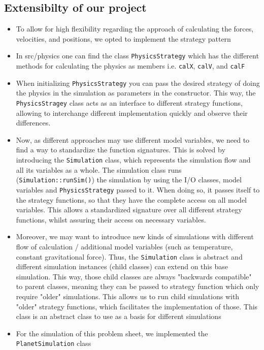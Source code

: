 \documentclass{article}
\begin{document}
\subsection{Extensibilty of our project}
\begin{itemize}
    \item To allow for high flexibility regarding the approach of calculating the forces, velocities, and positions, we opted to implement the strategy pattern
    \item In src/physics one can find the class \verb|PhysicsStrategy| which has the different methods for calculating the physics as members i.e. \verb|calX|, \verb|calV|, and \verb|calF|
    \item When initializing \verb|PhysicsStrategy| you can pass the desired strategy of doing the physics in the simulation as parameters in the constructor. This way, the \verb|PhysicsStragey| class acts as an interface to different strategy functions, allowing to interchange different implementation quickly and observe their differences.
    \item Now, as different approaches may use different model variables, we need to find a way to standardize the function signatures. This is solved by introducing the \verb|Simulation| class, which represents the simulation flow and all its variables as a whole. The simulation class runs (\verb|Simulation::runSim()|) the simulation by using the I/O classes, model variables and \verb|PhysicsStrategy| passed to it. When doing so, it passes itself to the strategy functions, so that they have the complete access on all model variables. This allows a standardized signature over all different strategy functions, whilst assuring their access on necessary variables.
    \item Moreover, we may want to introduce new kinds of simulations with different flow of calculation / additional model variables (such as temperature, constant gravitational force). Thus, the \verb|Simulation| class is abstract and different simulation instances (child classes) can extend on this base simulation. This way, those child classes are always "backwards compatible" to parent classes, meaning they can be passed to strategy function which only require "older" simulations. This allows us to run child simulations with "older" strategy functions, which facilitates the implementation of those.
        This class is an abstract class to use as a basis for different simulations
    \item For the simulation of this problem sheet, we implemented the \verb|PlanetSimulation| class


\end{itemize}
\end{document}

